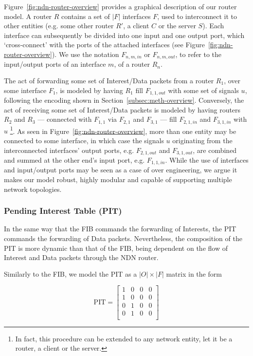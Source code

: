 Figure~\ref{fig:ndn-router-overview} provides a graphical description of our 
router model. A router $R$ contains a set of $|F|$ interfaces $F$, used to interconnect 
it to other entities (e.g. some other router $R'$, a client $C$ or the server 
$S$). Each interface can subsequently be divided into one input and one output 
port, which `cross-connect' with the ports of the attached 
interfaces (see Figure~\ref{fig:ndn-router-overview}). We use the notation 
$F_{n,m,in}$ or $F_{n,m,out}$, to refer to the 
input\slash output ports of an interface $m$, of a router $R_n$.\shortvertbreak

The act of forwarding some set of Interest\slash Data packets from a router $R_1$, 
over some interface $F_1$, is modeled by having $R_1$ fill $F_{1,1,out}$ with 
some set of signals $u$, following the encoding shown in 
Section~\ref{subsec:meth-overview}. Conversely, the act of receiving some set 
of Interest\slash Data packets is modeled by having routers $R_2$ and $R_3$ --- 
connected with $F_{1,1}$ via $F_{2,1}$ and $F_{3,1}$ --- fill $F_{2,1,in}$ and $F_{3,1,in}$ 
with $u$ \footnote{In fact, this procedure can be extended to any network entity, let 
it be a router, a client or the server.}. As seen in Figure~\ref{fig:ndn-router-overview}, 
more than one entity may be connected to some interface, in which case the 
signals $u$ originating from the interconnected interfaces' output ports, 
e.g. $F_{2,1,out}$ and $F_{3,1,out}$, are combined and summed at the other 
end's input port, e.g. $F_{1,1,in}$. While the use of interfaces and 
input\slash output ports may be seen as a case of over engineering, we argue 
it makes our model robust, highly modular and capable of supporting multiple 
network topologies.\shortvertbreak

\subsubsection{Pending Interest Table (PIT)}
\label{subsec:meth-pit}

In the same way that the FIB commands the forwarding of Interests, the PIT 
commands the forwarding of Data packets. Nevertheless, the composition of the 
PIT is more dynamic than that of the FIB, being dependent on the flow of 
Interest and Data packets through the NDN router.\shortvertbreak

Similarly to the FIB, we model the PIT as a $|O| \times |F|$ matrix in the 
form

\begin{equation}
\text{PIT} = \begin{bmatrix} 1 & 0 & 0 & 0  \\ 
                1 & 0 & 0 & 0               \\ 
                0 & 1 & 0 & 0               \\ 
                0 & 1 & 0 & 0               \\ \end{bmatrix}
    \label{eq:pit}
\end{equation}\shortvertbreak

